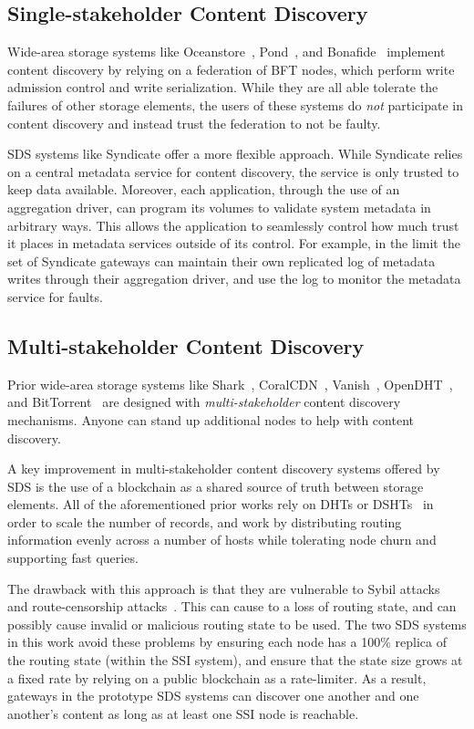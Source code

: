 \subsection{Single-stakeholder Content Discovery}

Wide-area storage systems like Oceanstore~\cite{oceanstore}, Pond~\cite{pond},
and Bonafide~\cite{bonafide} implement content discovery by relying on a
federation of BFT nodes, which perform write admission control and write
serialization.  While they are all able tolerate the failures of other storage
elements, the users of these systems do \emph{not} participate in content
discovery and instead trust the federation to not be faulty.

SDS systems like Syndicate offer a more flexible approach.  While Syndicate
relies on a central metadata service for content discovery, the service is only
trusted to keep data available.  Moreover, each application, through the use of an aggregation driver, can
program its volumes to validate system metadata in arbitrary ways.  This allows
the application to seamlessly control how much trust it places in metadata
services outside of its control.  For example, in the limit
the set of Syndicate gateways can maintain their own replicated log of metadata
writes through their aggregation driver,
and use the log to monitor the metadata service for faults.

\subsection{Multi-stakeholder Content Discovery}

Prior wide-area storage systems like Shark~\cite{shark}, CoralCDN~\cite{coral}, Vanish~\cite{vanish},
OpenDHT~\cite{opendht}, and BitTorrent~\cite{bittorrent} are designed with
\emph{multi-stakeholder} content discovery mechanisms.  Anyone can stand up additional
nodes to help with content discovery.

A key improvement in multi-stakeholder content discovery systems offered by SDS
is the use of a blockchain as a shared source of truth between storage elements.
All of the aforementioned prior works rely on DHTs or DSHTs~\cite{dsht} in order to
scale the number of records, and work by distributing routing information
evenly across a number of hosts while tolerating node churn and supporting
fast queries.

The drawback with this approach is that they are vulnerable to Sybil
attacks~\cite{sybil-attack} and route-censorship
attacks~\cite{dht-route-censorship}.  This can cause to a loss of routing state,
and can possibly cause invalid or malicious routing state to be used.
The two SDS systems in this work avoid these problems by ensuring each node has a 100\% replica of the
routing state (within the SSI system), and ensure that the state size grows at a fixed rate by relying
on a public blockchain as a rate-limiter.  As a result, gateways in the
prototype SDS systems can discover one another and one another's content as long
as at least one SSI node is reachable.

